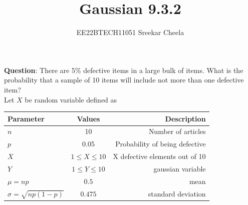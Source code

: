 \documentclass[journal,12pt,twocolumn]{IEEEtran}
\theoremstyle{remark}
\begin{document}

\vspace{3cm}

\title{Gaussian 9.3.2}
\author{EE22BTECH11051 Sreekar Cheela}
\maketitle
\newpage
\bigskip
\renewcommand{\thefigure}{\theenumi}
\renewcommand{\thetable}{\theenumi}

\textbf{Question}: There are 5\% defective items in a large bulk of items. What is the probability that a sample of 10 items will include not more than one defective item?\\
\solution 
Let $X$ be random variable defined as\\
\begin{table}[h!]
 \begin{center}
    \begin{tabular}{|l|c|r|}
    \hline
    Parameter & Values & Description\\
    \hline
    $n$ & 10 & Number of articles\\
    \hline
    $p$ & 0.05 & Probability of being defective\\
    \hline
    $X$ & $1\leq X \leq 10$
    & X defective elements out of 10\\
    \hline
    $Y$ & $1\leq Y \leq 10$
    & gaussian variable\\
    \hline
    $\mu=np$ & $0.5$ & mean\\
    \hline
    $\sigma=\sqrt{np(1-p)}$ & $0.475$ & standard deviation\\
    \hline
    \end{tabular}
    \end{center}
  \label{table:/9/3/2} 
\end{table}
\end{document}
